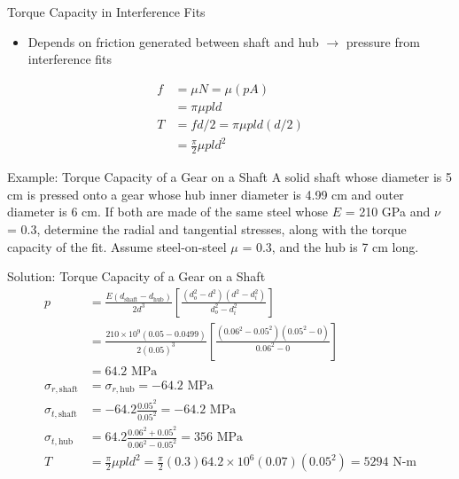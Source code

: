 \documentclass[10pt, svgnames]{beamer}
\begin{document}
\begin{frame}[label={sec:org0038139}]{Torque Capacity in Interference Fits}
\begin{itemize}
\item Depends on friction generated between shaft and hub \(\rightarrow\) pressure from interference fits
\end{itemize}


\begin{align*}
  f &= \mu N = \mu (pA) \\
    &= \pi \mu pld \\
  T &= fd/2 = \pi \mu pld(d/2) \\
    &= \frac{\pi}{2}\mu pld^{2}
\end{align*}
\end{frame}

\begin{frame}[label={sec:org0676c93}]{Example: Torque Capacity of a Gear on a Shaft}
A solid shaft whose diameter is 5 cm is pressed onto a gear whose hub inner diameter is 4.99 cm and outer diameter is 6 cm. If both are made of the same steel whose \(E\) = 210 GPa and \(\nu\) = 0.3, determine the radial and tangential stresses, along with the torque capacity of the fit. Assume steel-on-steel \(\mu\) = 0.3, and the hub is 7 cm long.
\end{frame}

\begin{frame}[label={sec:org9b96f64}]{Solution: Torque Capacity of a Gear on a Shaft}
\begin{align*}
  p &= \frac{E(d_{\text{shaft}} - d_{\text{hub}})}{2d^{3}} \left[ \frac{(d_{o}^{2} - d^{2})(d^{2} - d_{i}^{2})}{d_{o}^{2} - d_{i}^{2}} \right] \\
    &= \frac{210 \times 10^{9} (0.05 - 0.0499)}{2(0.05)^{3}} \left[ \frac{(0.06^{2} - 0.05^{2})(0.05^{2} - 0)}{0.06^{2} - 0} \right] \\
    &= 64.2 \text{ MPa} \\
  \sigma_{r,\text{shaft}} &= \sigma_{r,\text{hub}} = -64.2 \text{ MPa} \\
  \sigma_{t,\text{shaft}} &= -64.2 \frac{0.05^{2}}{0.05^{2}} = -64.2 \text{ MPa} \\
  \sigma_{t,\text{hub}} &= 64.2 \frac{0.06^{2} + 0.05^{2}}{0.06^{2} - 0.05^{2}} = 356 \text{ MPa} \\
  T &= \frac{\pi}{2}\mu pld^{2} = \frac{\pi}{2}(0.3) 64.2 \times 10^{6} (0.07)(0.05^{2}) = 5294 \text{ N-m}
\end{align*}
\end{frame}
\end{document}
